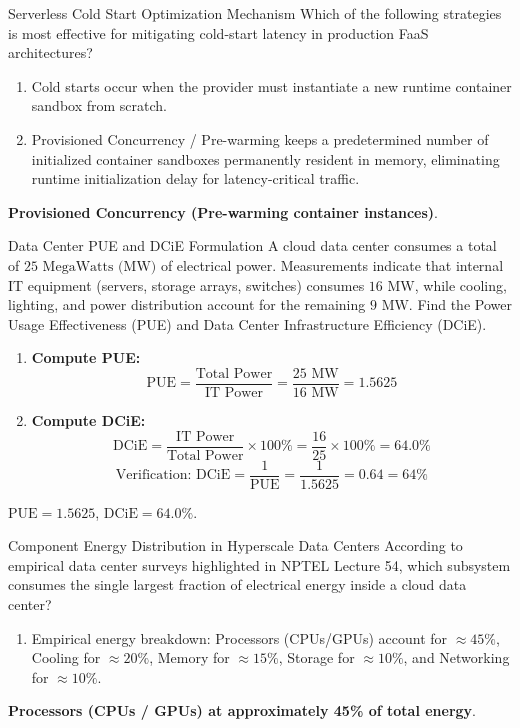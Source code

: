 \begin{solved}{Serverless Cold Start Optimization Mechanism}
\Given Which of the following strategies is most effective for mitigating cold-start latency in production FaaS architectures?
\Steps
\begin{enumerate}[leftmargin=*]
  \item Cold starts occur when the provider must instantiate a new runtime container sandbox from scratch.
  \item Provisioned Concurrency / Pre-warming keeps a predetermined number of initialized container sandboxes permanently resident in memory, eliminating runtime initialization delay for latency-critical traffic.
\end{enumerate}
\Answer \textbf{Provisioned Concurrency (Pre-warming container instances)}.
\end{solved}

\begin{solved}{Data Center PUE and DCiE Formulation}
\Given A cloud data center consumes a total of $25\text{ MegaWatts (MW)}$ of electrical power. Measurements indicate that internal IT equipment (servers, storage arrays, switches) consumes $16\text{ MW}$, while cooling, lighting, and power distribution account for the remaining $9\text{ MW}$. Find the Power Usage Effectiveness (PUE) and Data Center Infrastructure Efficiency (DCiE).
\Steps
\begin{enumerate}[leftmargin=*]
  \item \textbf{Compute PUE:}
  \begin{equation}
  \text{PUE} = \frac{\text{Total Power}}{\text{IT Power}} = \frac{25\text{ MW}}{16\text{ MW}} = 1.5625
  \end{equation}
  \item \textbf{Compute DCiE:}
  \begin{equation}
  \text{DCiE} = \frac{\text{IT Power}}{\text{Total Power}} \times 100\% = \frac{16}{25} \times 100\% = 64.0\%
  \end{equation}
  \begin{equation}
  \text{Verification: } \text{DCiE} = \frac{1}{\text{PUE}} = \frac{1}{1.5625} = 0.64 = 64\%
  \end{equation}
\end{enumerate}
\Answer \textbf{$\text{PUE} = 1.5625$}, \textbf{$\text{DCiE} = 64.0\%$}.
\end{solved}

\begin{solved}{Component Energy Distribution in Hyperscale Data Centers}
\Given According to empirical data center surveys highlighted in NPTEL Lecture 54, which subsystem consumes the single largest fraction of electrical energy inside a cloud data center?
\Steps
\begin{enumerate}[leftmargin=*]
  \item Empirical energy breakdown: Processors (CPUs/GPUs) account for $\approx 45\%$, Cooling for $\approx 20\%$, Memory for $\approx 15\%$, Storage for $\approx 10\%$, and Networking for $\approx 10\%$.
\end{enumerate}
\Answer \textbf{Processors (CPUs / GPUs) at approximately 45\% of total energy}.
\end{solved}

